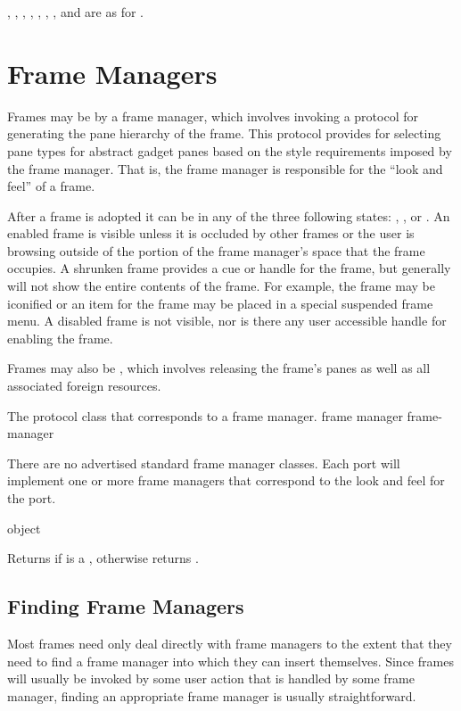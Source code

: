 , , , ,
, , , and  are
as for .


\section {Frame Managers}

Frames may be  by a frame manager, which involves invoking a
protocol for generating the pane hierarchy of the frame.  This protocol provides
for selecting pane types for abstract gadget panes based on the style
requirements imposed by the frame manager.  That is, the frame manager is
responsible for the ``look and feel'' of a frame.

After a frame is adopted it can be in any of the three following states:
, , or .  An enabled frame is
visible unless it is occluded by other frames or the user is browsing outside of
the portion of the frame manager's space that the frame occupies.  A shrunken
frame provides a cue or handle for the frame, but generally will not show the
entire contents of the frame.  For example, the frame may be iconified or an
item for the frame may be placed in a special suspended frame menu.  A disabled
frame is not visible, nor is there any user accessible handle for enabling the
frame.

Frames may also be , which involves releasing the frame's
panes as well as all associated foreign resources.


The protocol class that corresponds to a frame manager.
 {frame manager} {frame-manager}

There are no advertised standard frame manager classes.  Each port will
implement one or more frame managers that correspond to the look and feel for
the port.

 {object}

Returns  if  is a , otherwise returns
.


\subsection {Finding Frame Managers}

Most frames need only deal directly with frame managers to the extent that they
need to find a frame manager into which they can insert themselves.  Since
frames will usually be invoked by some user action that is handled by some frame
manager, finding an appropriate frame manager is usually straightforward.

